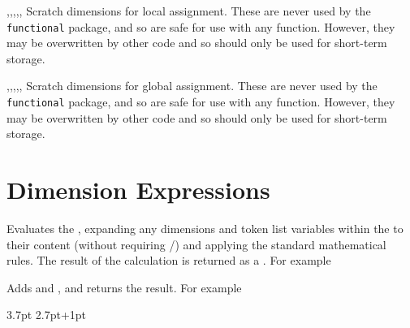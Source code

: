 \documentclass[oneside]{book}
\begin{document}
\begin{variable}{\lTmpaDim,\lTmpbDim,\lTmpcDim,\lTmpiDim,\lTmpjDim,\lTmpkDim}
Scratch dimensions for local assignment. These are never used by
the \verb!functional! package, and so are safe for use with any
function. However, they may be overwritten by other
code and so should only be used for short-term storage.
\end{variable}

\begin{variable}{\gTmpaDim,\gTmpbDim,\gTmpcDim,\gTmpiDim,\gTmpjDim,\gTmpkDim}
Scratch dimensions for global assignment. These are never used by
the \verb!functional! package, and so are safe for use with any
function. However, they may be overwritten by other
code and so should only be used for short-term storage.
\end{variable}

\section{Dimension Expressions}

\begin{function}{\DimEval}
\begin{syntax}
 
\end{syntax}
Evaluates the , expanding any
dimensions and token list variables within the 
to their content (without requiring /)
and applying the standard mathematical rules. The result of the
calculation is returned as a .
For example
\begin{demohigh}
\end{demohigh}
\end{function}

\begin{function}{\DimMathAdd}
\begin{syntax}
  
\end{syntax}
Adds  and ,
and returns the result. For example
\begin{demohigh}
\DimMathAdd {2.8pt} {3.7pt}
\DimMathAdd {3.8pt-1pt} {2.7pt+1pt}
\end{demohigh}
\end{function}
\end{document}
